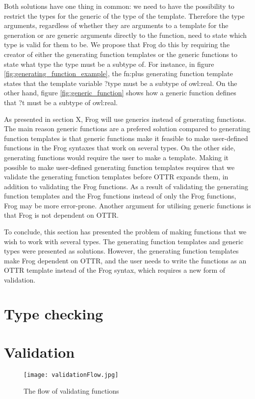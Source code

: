 \para 
Both solutions have one thing in common: we need to have the possibility to restrict the types for the generic of the type of the template. Therefore the type arguments, regardless of whether they are arguments to a template for the generation or are generic arguments directly to the function, need to state which type is valid for them to be. We propose that Frog do this by requiring the creator of either the generating function templates or the generic functions to state what type the type must be a subtype of. For instance, in figure \ref{fig:generating_function_example}, the fn:plus generating function template states that the template variable ?type must be a subtype of owl:real. On the other hand, figure \ref{fig:generic_function} shows how a generic function defines that ?t must be a subtype of owl:real. 

\para 
As presented in section X, Frog will use generics instead of generating functions. The main reason generic functions are a prefered solution compared to generating function templates is that generic functions make it feasible to make user-defined functions in the Frog syntaxes that work on several types. On the other side, generating functions would require the user to make a template. Making it possible to make user-defined generating function templates requires that we validate the generating function templates before OTTR expands them, in addition to validating the Frog functions. As a result of validating the generating function templates and the Frog functions instead of only the Frog functions, Frog may be more error-prone. Another argument for utilising generic functions is that Frog is not dependent on OTTR. 

\para
To conclude, this section has presented the problem of making functions that we wish to work with several types. The generating function templates and generic types were presented as solutions. However, the generating function templates make Frog dependent on  OTTR, and the user needs to write the functions as an OTTR template instead of the Frog syntax, which requires a new form of validation. 

\section{Type checking}

\section{Validation}
\begin{figure}
    \centering
    \texttt{[image: validationFlow.jpg]}
    \caption{The flow of validating functions}
    \label{fig:LC-explenations}
\end{figure}

